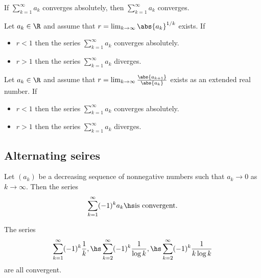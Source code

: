\documentclass{article}
\begin{document}
\begin{theorem}
    If $\sum_{k=1}^\infty a_k$ converges absolutely, then $\sum_{k=1}^\infty a_k$
    converges.
\end{theorem}

\begin{theorem}
    Let $a_k\in\R$ and assume that $r=\lim_{k\to\infty} \abs{a_k}^{1/k}$
    exists. If
    \begin{itemize}
        \item $r<1$ then the series $\sum_{k=1}^\infty a_k$ converges absolutely.
        \item $r>1$ then the series $\sum_{k=1}^\infty a_k$ diverges.
    \end{itemize} 
\end{theorem}

\setcounter{theorem}{4}
\begin{theorem}
    Let $a_k\in\R$ and assume that $r=\lim_{k\to\infty}\frac{\abs{a_{k+1}}}{\abs{a_k}}$
    exists as an extended real number. If
    \begin{itemize}
        \item $r<1$ then the series $\sum_{k=1}^\infty a_k$ converges absolutely.
        \item $r>1$ then the series $\sum_{k=1}^\infty a_k$ diverges.
    \end{itemize}
\end{theorem}

\subsection{Alternating seires}

\begin{theorem}
    Let $(a_k)$ be a decreasing sequence of nonnegative numbers such that
    $a_k\to 0$ as $k\to\infty$. Then the series
    \begin{align*}
        \sum_{k=1}^\infty (-1)^k a_k\hs\text{is convergent}.
    \end{align*} 
\end{theorem}

\begin{corollary}
    The series
    \begin{align*}
        \sum_{k=1}^\infty (-1)^k\frac{1}{k},\hs \sum_{k=2}^\infty (-1)^k\frac{1}{\log k},
        \hs \sum_{k=2}^\infty (-1)^k\frac{1}{k\log k}
    \end{align*}
    are all convergent.
\end{corollary}
\end{document}
